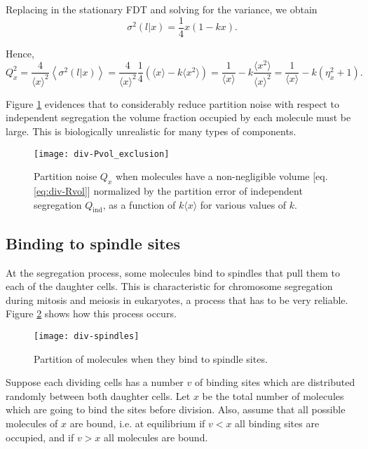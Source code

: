 Replacing in the stationary FDT and solving for the variance, we obtain
\begin{equation*}
  \sigma^2(l|x) = \frac{1}{4}x(1-kx).
\end{equation*}

Hence,
\begin{equation}
  \label{eq:div-Rvol}
  Q_x^2 = \frac{4}{\langle x\rangle^2}\left\langle \sigma^2(l|x)\right\rangle = \frac{4}{\langle x\rangle^2}\frac{1}{4}\left(\langle x\rangle-k\langle x^2\rangle\right) = \frac{1}{\langle x\rangle} - k\frac{\langle x^2\rangle}{\langle x\rangle^2} = \frac{1}{\langle x\rangle} - k(\eta_x^2+1).
\end{equation}

Figure \ref{fig:div-Pvol_exclusion} evidences that to considerably reduce partition noise with respect to independent segregation the volume fraction occupied by each molecule must be large. This is biologically unrealistic for many types of components.
\begin{figure}[H]
  \centering
  \texttt{[image: div-Pvol\_exclusion]}
  \caption[Partition noise when molecules have a non-negligible volume]{\label{fig:div-Pvol_exclusion}Partition noise $Q_x$ when molecules have a non-negligible volume [eq. \eqref{eq:div-Rvol}] normalized by the partition error of independent segregation $Q_\text{ind}$, as a function of $k\langle x\rangle$ for various values of $k$.}
\end{figure}

\subsection{Binding to spindle sites}

At the segregation process, some molecules bind to spindles that pull them to each of the daughter cells. This is characteristic for chromosome segregation during mitosis and meiosis in eukaryotes, a process that has to be very reliable. Figure \ref{fig:div-spindles} shows how this process occurs.
\begin{figure}[H]
  \centering
  \texttt{[image: div-spindles]}
  \caption[Partition of molecules when they bind to spindle sites]{\label{fig:div-spindles} Partition of molecules when they bind to spindle sites.}
\end{figure}

Suppose each dividing cells has a number $v$ of binding sites which are distributed randomly between both daughter cells. Let $x$ be the total number of molecules which are going to bind the sites before division. Also, assume that all possible molecules of $x$ are bound, i.e. at equilibrium if $v<x$ all binding sites are occupied, and if $v>x$ all molecules are bound.

